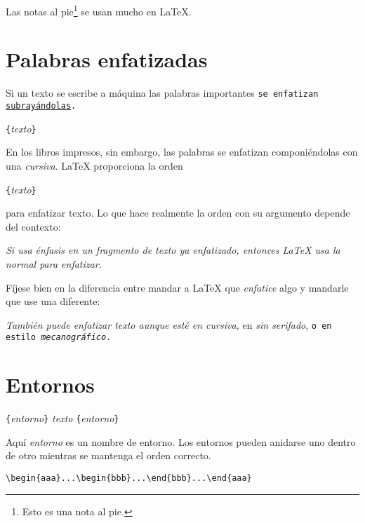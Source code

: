 \begin{example}
Las notas al pie\footnote{Esto
es una nota al pie.} se usan
mucho en \LaTeX.
\end{example}
 
\section{Palabras enfatizadas}

Si un texto se escribe a máquina las palabras importantes \texttt{se  enfatizan \underline{subrayándolas}.}
\begin{lscommand}
\verb|{|\emph{texto}\verb|}|
\end{lscommand}
En los libros impresos, sin embargo, las palabras se enfatizan componiéndolas con una \fontnomo{} \emph{cursiva}.  \LaTeX{} proporciona la orden
\begin{lscommand}
\verb|{|\emph{texto}\verb|}|
\end{lscommand}
para enfatizar texto.  Lo que hace realmente la orden con su argumento depende del contexto:

\begin{example}
\emph{Si usa énfasis en un
  fragmento de texto ya
  enfatizado, entonces
  \LaTeX{} usa la \fontnomo{}
  \emph{normal} para
  enfatizar.}
\end{example}

Fíjese bien en la diferencia entre mandar a \LaTeX{} que \emph{enfatice} algo y mandarle que use una \emph{\fontnomo{}} diferente:

\begin{example}
\textit{También puede
  \emph{enfatizar} texto
  aunque esté en cursiva,} 
\textsf{en \fontnomo{} 
  \emph{sin serifado},}
\texttt{o en estilo
  \emph{mecanográfico}.}
\end{example}

\section{Entornos} \label{env}

\begin{lscommand}
\verb|{|\emph{entorno}\verb|}|\quad
   \emph{texto}\quad
{}\verb|{|\emph{entorno}\verb|}|
\end{lscommand}
Aquí \emph{entorno} es un nombre de entorno.  Los entornos pueden anidarse uno dentro de otro mientras se mantenga el orden correcto.
\begin{code}
\verb|\begin{aaa}...\begin{bbb}...\end{bbb}...\end{aaa}|
\end{code}

